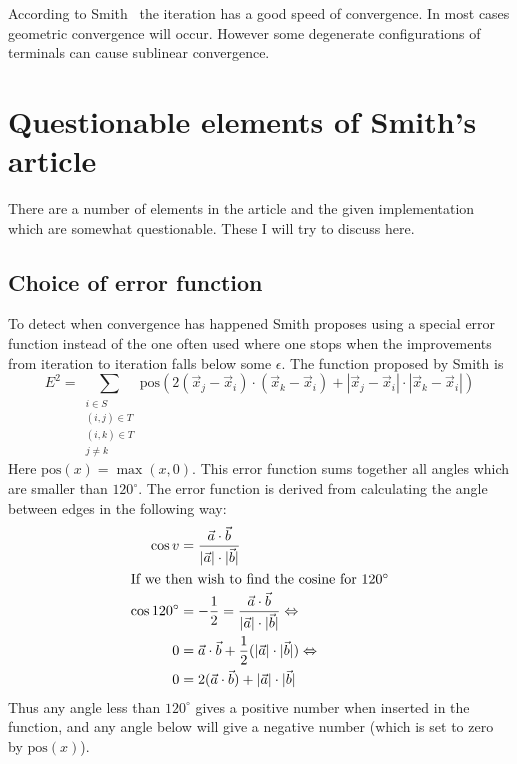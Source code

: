 According to Smith~\cite[p.~150]{Smith1992} the iteration has a good speed of
convergence. In most cases geometric convergence will occur. However some
degenerate configurations of terminals can cause sublinear convergence.


\section{Questionable elements of Smith's article}
\label{sec:quest-elem-smiths}

There are a number of elements in the article and the given
implementation~\cite{Smith1992} which are somewhat questionable.  These I will
try to discuss here.

\subsection{Choice of error function}
\label{sec:choice-error-funct}

To detect when convergence has happened Smith proposes using a special
error function instead of the one often used where one stops when the
improvements from iteration to iteration falls below some $\epsilon$.  The
function proposed by Smith is
%
\begin{equation}
  E^2 = \sum_{
    \begin{array}{c} i \in S \\ (i,j) \in T \\ (i,k) \in T \\ j \ne k
    \end{array}} \text{pos} (2 (\vec x_j - \vec x_i) \cdot (\vec x_k - \vec x_i)
+ | \vec x_j - \vec x_i | \cdot | \vec x_k - \vec x_i |)
\end{equation}
%
Here $\text{pos}(x) = \max(x, 0)$.  This error function sums together all angles which
are smaller than $120^{\circ}$.  The error function is derived from calculating
the angle between edges in the following way:
%
\begin{align}
  \cos v & = \frac{\vec a \cdot \vec b}
    {|\vec a| \cdot |\vec b|}                 \\
  \intertext{If we then wish to find the cosine for $120^{\circ}$}
  \cos 120^{\circ}
         & = -\frac{1}{2} = \frac{\vec a \cdot \vec b}
    {|\vec a| \cdot |\vec b|} \Leftrightarrow \\
  0      & = \vec a \cdot \vec b + \frac{1}{2}
    (|\vec a| \cdot |\vec b|) \Leftrightarrow \\
  0      & = 2 (\vec a \cdot \vec b) + |\vec a| \cdot |\vec b|
\end{align}
%
Thus any angle less than $120^{\circ}$ gives a positive number when inserted in
the function, and any angle below will give a negative number (which is set to
zero by $\text{pos}(x)$).

